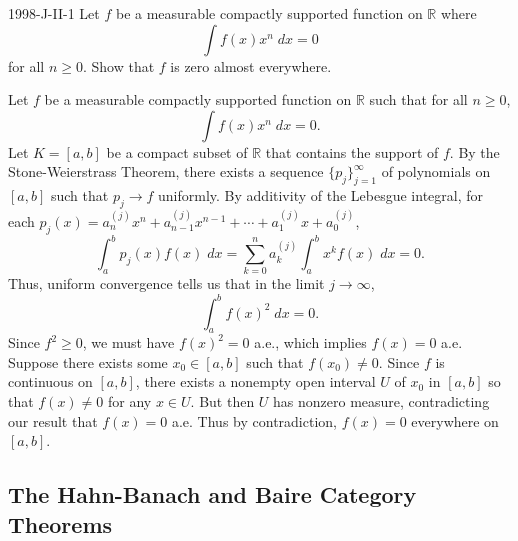 \documentclass{article}
\begin{document}
	\begin{prb}{1998-J-II-1}
		Let $f$ be a measurable compactly supported function on $\mathbb{R}$ where 
		\begin{equation*}
			\int f(x)x^n\;dx = 0 
		\end{equation*}
		for all $n\geq 0$. Show that $f$ is zero almost everywhere. 
	\end{prb}
	Let $f$ be a measurable compactly supported function on $\mathbb{R}$ such that for all $n \geq 0$, 
	\begin{equation*}
		\int f(x)x^n\;dx = 0. 
	\end{equation*}
	Let $K = [a,b]$ be a compact subset of $\mathbb{R}$ that contains the support of $f$. By the Stone-Weierstrass Theorem, there exists a sequence $\{p_j\}_{j = 1}^{\infty}$ of polynomials on $[a,b]$ such that $p_j \to f$ uniformly. By additivity of the Lebesgue integral, for each $p_j(x) = a^{(j)}_nx^n + a^{(j)}_{n-1}x^{n-1} + \dotsm + a^{(j)}_{1}x + a_{0}^{(j)}$, 
	\begin{equation*}
		\int_{a}^{b}p_j(x)f(x)\;dx = \sum_{k  = 0}^{n}a_{k}^{(j)}\int_{a}^{b}x^{k}f(x)\;dx = 0. 
	\end{equation*}
	Thus, uniform convergence tells us that in the limit $j \to \infty$, 
	\begin{equation*}
		\int_{a}^{b}f(x)^2\;dx = 0. 
	\end{equation*}
	Since $f^2 \geq 0$, we must have $f(x)^2 = 0$ a.e., which implies $f(x) =0$ a.e. Suppose there exists some $x_0 \in [a,b]$ such that $f(x_0) \neq 0$. Since $f$ is continuous on $[a,b]$, there exists a nonempty open interval $U$ of $x_0$ in $[a,b]$ so that $f(x) \neq 0$ for any $x \in U$. But then $U$ has nonzero measure, contradicting our result that $f(x) =0 $ a.e. Thus by contradiction, $f(x) = 0$ everywhere on $[a,b]$. 
	
	\subsection{The Hahn-Banach and Baire Category Theorems}
	
\end{document}
